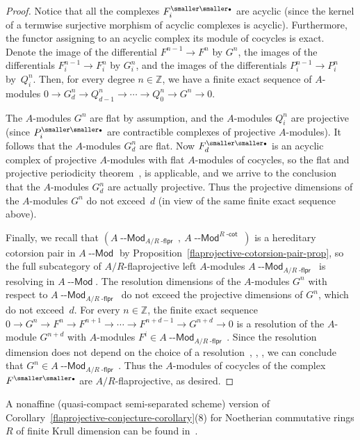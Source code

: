 \documentclass[12pt,a4paper]{amsart}
\newcommand{\+}{\nobreakdash-}
\renewcommand{\:}{\colon}
\newcommand{\rarrow}{\longrightarrow}
\newcommand{\bu}{{\text{\smaller\smaller$\scriptstyle\bullet$}}}
\newcommand{\Modl}{{\operatorname{\mathsf{--Mod}}}}
\newcommand{\dcot}{{\operatorname{\mathsf{-cot}}}}
\newcommand{\dflpr}{{\operatorname{\mathsf{-flpr}}}}
\newcommand{\boZ}{\mathbb Z}
\theoremstyle{plain}
\theoremstyle{definition}
\begin{document}
\begin{proof}
 Notice that all the complexes $F_i^\bu$ are acyclic (since the kernel
of a termwise surjective morphism of acyclic complexes is acyclic).
 Furthermore, the functor assigning to an acyclic complex its module of
cocycles is exact.
 Denote the image of the differential $F^{n-1}\rarrow F^n$ by $G^n$,
the images of the differentials $F_i^{n-1}\rarrow F_i^n$ by $G_i^n$,
and the images of the differentials $P_i^{n-1}\rarrow P_i^n$ by~$Q_i^n$.
 Then, for every degree $n\in\boZ$, we have a finite exact sequence of
$A$\+modules $0\rarrow G_d^n\rarrow Q_{d-1}^n\rarrow\dotsb\rarrow
Q_0^n\rarrow G^n\rarrow0$.

 The $A$\+modules $G^n$ are flat by assumption, and the $A$\+modules
$Q_i^n$ are projective (since $P_i^\bu$ are contractible complexes of
projective $A$\+modules).
 It follows that the $A$\+modules $G_d^n$ are flat.
 Now $F_d^\bu$ is an acyclic complex of projective $A$\+modules with
flat $A$\+modules of cocycles, so the flat and projective periodicity
theorem~\cite[Theorem~2.5]{BG}, \cite[Remark~2.15]{Neem} is applicable,
and we arrive to the conclusion that the $A$\+modules $G_d^n$ are
actually projective.
 Thus the projective dimensions of the $A$\+modules $G^n$ do not
exceed~$d$ (in view of the same finite exact sequence above).

 Finally, we recall that $(A\Modl_{A/R\dflpr},\>A\Modl^{R\dcot})$ is
a hereditary cotorsion pair in $A\Modl$ by
Proposition~\ref{flaprojective-cotorsion-pair-prop}, so the full
subcategory of $A/R$\+flaprojective left $A$\+modules
$A\Modl_{A/R\dflpr}$ is resolving in $A\Modl$.
 The resolution dimensions of the $A$\+modules $G^n$ with respect to
$A\Modl_{A/R\dflpr}$ do not exceed the projective dimensions of $G^n$,
which do not exceed~$d$.
 For every $n\in\boZ$, the finite exact sequence
$0\rarrow G^n\rarrow F^n\rarrow F^{n+1}\rarrow\dotsb\rarrow F^{n+d-1}
\rarrow G^{n+d}\rarrow0$ is a resolution of the $A$\+module $G^{n+d}$
with $A$\+modules $F^i\in A\Modl_{A/R\dflpr}$.
 Since the resolution dimension does not depend on the choice of
a resolution~\cite[Lemma~2.1]{Zhu}, \cite[Proposition~2.3]{Sto0},
\cite[Corollary~A.5.2]{Pcosh}, we can conclude that
$G^n\in A\Modl_{A/R\dflpr}$.
 Thus the $A$\+modules of cocycles of the complex $F^\bu$ are
$A/R$\+flaprojective, as desired.
\end{proof}

 A nonaffine (quasi-compact semi-separated scheme) version of
Corollary~\ref{flaprojective-conjecture-corollary}(8)
for Noetherian commutative rings $R$ of finite Krull dimension
can be found in~\cite[Theorem~15.22]{Pdomc}.
\end{document}
